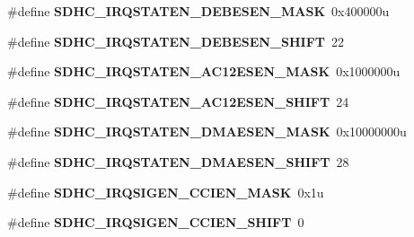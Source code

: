 \begin{DoxyCompactItemize}
\item 
\hypertarget{group___s_d_h_c___register___masks_ga1a3c5402282178d4d694355f5bca0870}{}\#define {\bfseries S\+D\+H\+C\+\_\+\+I\+R\+Q\+S\+T\+A\+T\+E\+N\+\_\+\+D\+E\+B\+E\+S\+E\+N\+\_\+\+M\+A\+S\+K}~0x400000u\label{group___s_d_h_c___register___masks_ga1a3c5402282178d4d694355f5bca0870}

\item 
\hypertarget{group___s_d_h_c___register___masks_ga7911ed6d7633685d285f4934e301bde6}{}\#define {\bfseries S\+D\+H\+C\+\_\+\+I\+R\+Q\+S\+T\+A\+T\+E\+N\+\_\+\+D\+E\+B\+E\+S\+E\+N\+\_\+\+S\+H\+I\+F\+T}~22\label{group___s_d_h_c___register___masks_ga7911ed6d7633685d285f4934e301bde6}

\item 
\hypertarget{group___s_d_h_c___register___masks_gab127f67378a192bb2db22591ef7d39f7}{}\#define {\bfseries S\+D\+H\+C\+\_\+\+I\+R\+Q\+S\+T\+A\+T\+E\+N\+\_\+\+A\+C12\+E\+S\+E\+N\+\_\+\+M\+A\+S\+K}~0x1000000u\label{group___s_d_h_c___register___masks_gab127f67378a192bb2db22591ef7d39f7}

\item 
\hypertarget{group___s_d_h_c___register___masks_ga14c140e22b678c345119a68af9bef146}{}\#define {\bfseries S\+D\+H\+C\+\_\+\+I\+R\+Q\+S\+T\+A\+T\+E\+N\+\_\+\+A\+C12\+E\+S\+E\+N\+\_\+\+S\+H\+I\+F\+T}~24\label{group___s_d_h_c___register___masks_ga14c140e22b678c345119a68af9bef146}

\item 
\hypertarget{group___s_d_h_c___register___masks_ga3f042673e4eb942992f5f5c670e3f3d7}{}\#define {\bfseries S\+D\+H\+C\+\_\+\+I\+R\+Q\+S\+T\+A\+T\+E\+N\+\_\+\+D\+M\+A\+E\+S\+E\+N\+\_\+\+M\+A\+S\+K}~0x10000000u\label{group___s_d_h_c___register___masks_ga3f042673e4eb942992f5f5c670e3f3d7}

\item 
\hypertarget{group___s_d_h_c___register___masks_gaeaf5be970bbb56b0ccbae03ece8dede6}{}\#define {\bfseries S\+D\+H\+C\+\_\+\+I\+R\+Q\+S\+T\+A\+T\+E\+N\+\_\+\+D\+M\+A\+E\+S\+E\+N\+\_\+\+S\+H\+I\+F\+T}~28\label{group___s_d_h_c___register___masks_gaeaf5be970bbb56b0ccbae03ece8dede6}

\item 
\hypertarget{group___s_d_h_c___register___masks_ga393b56f0275bd461a60df5d1dad40370}{}\#define {\bfseries S\+D\+H\+C\+\_\+\+I\+R\+Q\+S\+I\+G\+E\+N\+\_\+\+C\+C\+I\+E\+N\+\_\+\+M\+A\+S\+K}~0x1u\label{group___s_d_h_c___register___masks_ga393b56f0275bd461a60df5d1dad40370}

\item 
\hypertarget{group___s_d_h_c___register___masks_ga7eed6122d048bd5f722d250817adcc96}{}\#define {\bfseries S\+D\+H\+C\+\_\+\+I\+R\+Q\+S\+I\+G\+E\+N\+\_\+\+C\+C\+I\+E\+N\+\_\+\+S\+H\+I\+F\+T}~0\label{group___s_d_h_c___register___masks_ga7eed6122d048bd5f722d250817adcc96}


\end{DoxyCompactItemize}
